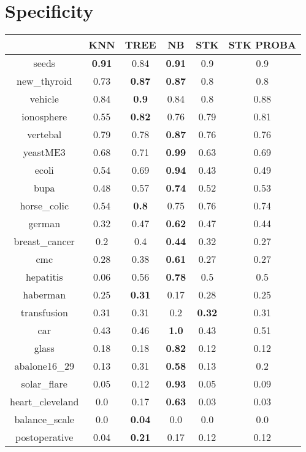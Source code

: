\documentclass{article}%
\begin{document}
\section*{Specificity}%
\begin{tabular}{c|ccccc}%
&KNN&TREE&NB&STK&STK PROBA\\%
\hline%
seeds&\textbf{0.91}&0.84&\textbf{0.91}&0.9&0.9\\%
new\_thyroid&0.73&\textbf{0.87}&\textbf{0.87}&0.8&0.8\\%
vehicle&0.84&\textbf{0.9}&0.84&0.8&0.88\\%
ionosphere&0.55&\textbf{0.82}&0.76&0.79&0.81\\%
vertebal&0.79&0.78&\textbf{0.87}&0.76&0.76\\%
yeastME3&0.68&0.71&\textbf{0.99}&0.63&0.69\\%
ecoli&0.54&0.69&\textbf{0.94}&0.43&0.49\\%
bupa&0.48&0.57&\textbf{0.74}&0.52&0.53\\%
horse\_colic&0.54&\textbf{0.8}&0.75&0.76&0.74\\%
german&0.32&0.47&\textbf{0.62}&0.47&0.44\\%
breast\_cancer&0.2&0.4&\textbf{0.44}&0.32&0.27\\%
cmc&0.28&0.38&\textbf{0.61}&0.27&0.27\\%
hepatitis&0.06&0.56&\textbf{0.78}&0.5&0.5\\%
haberman&0.25&\textbf{0.31}&0.17&0.28&0.25\\%
transfusion&0.31&0.31&0.2&\textbf{0.32}&0.31\\%
car&0.43&0.46&\textbf{1.0}&0.43&0.51\\%
glass&0.18&0.18&\textbf{0.82}&0.12&0.12\\%
abalone16\_29&0.13&0.31&\textbf{0.58}&0.13&0.2\\%
solar\_flare&0.05&0.12&\textbf{0.93}&0.05&0.09\\%
heart\_cleveland&0.0&0.17&\textbf{0.63}&0.03&0.03\\%
balance\_scale&0.0&\textbf{0.04}&0.0&0.0&0.0\\%
postoperative&0.04&\textbf{0.21}&0.17&0.12&0.12\\%
\end{tabular}

%
\end{document}
